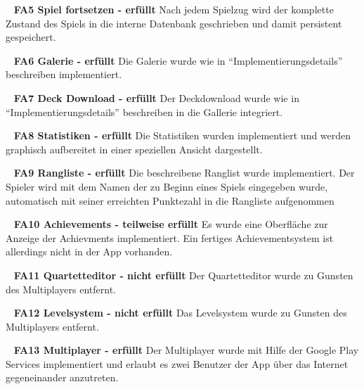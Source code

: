 \documentclass{scrartcl}
\begin{document}
\ \newline
\textbf{FA5 Spiel fortsetzen - erfüllt} \newline
Nach jedem Spielzug wird der komplette Zustand des Spiels in die interne
Datenbank geschrieben und damit persistent gespeichert.

\ \newline
\textbf{FA6 Galerie - erfüllt} \newline
Die Galerie wurde wie in \enquote{Implementierungsdetails} beschreiben
implementiert.

\ \newline
\textbf{FA7 Deck Download - erfüllt} \newline
Der Deckdownload wurde wie in \enquote{Implementierungsdetails} beschreiben in
die Gallerie integriert.

\ \newline
\textbf{FA8 Statistiken - erfüllt} \newline
Die Statistiken wurden implementiert und werden graphisch aufbereitet in einer
speziellen Ansicht dargestellt.

\ \newline
\textbf{FA9 Rangliste - erfüllt} \newline
Die beschreibene Ranglist wurde implementiert. Der Spieler wird mit dem Namen
der zu Beginn eines Spiels eingegeben wurde, automatisch mit seiner erreichten
Punktezahl in die Rangliste aufgenommen

\ \newline
\textbf{FA10 Achievements - teilweise erfüllt} \newline
Es wurde eine Oberfläche zur Anzeige der Achievments implementiert. Ein fertiges
Achievementsystem ist allerdings nicht in der App vorhanden.

\ \newline
\textbf{FA11 Quartetteditor - nicht erfüllt} \newline
Der Quartetteditor wurde zu Gunsten des Multiplayers entfernt.

\ \newline
\textbf{FA12 Levelsystem - nicht erfüllt} \newline
Das Levelsystem wurde zu Gunsten des Multiplayers entfernt.

\ \newline
\textbf{FA13 Multiplayer - erfüllt} \newline
Der Multiplayer wurde mit Hilfe der Google Play Services implementiert und
erlaubt es zwei Benutzer der App über das Internet gegeneinander anzutreten.
\end{document}
